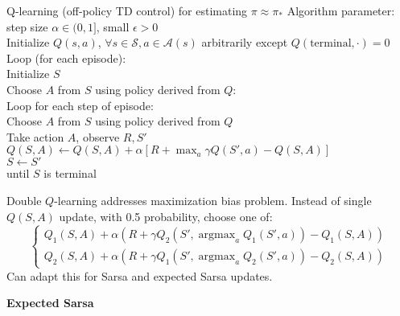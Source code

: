 \documentclass[twocolumn]{article}
\DeclareMathOperator*{\argmax}{argmax}
\begin{document}
\begin{mydef}{Q-learning (off-policy TD control) for estimating $\pi \approx \pi_*$}{}
    Algorithm parameter: step size $\alpha \in (0, 1]$, small $\epsilon > 0$ \\
    Initialize $Q(s,a)$, $\forall s \in \mathcal S, a \in \mathcal A(s)$ arbitrarily except $Q(\text{terminal}, \cdot) = 0$ \\
    
        Loop (for each episode): \\
            \hspace*{2em}Initialize $S$ \\
            \hspace*{2em}Choose $A$ from $S$ using policy derived from $Q$: \\
            \hspace*{2em}Loop for each step of episode: \\
                \hspace*{4em}Choose $A$ from $S$ using policy derived from $Q$ \\
                \hspace*{4em}Take action $A$, observe $R, S'$ \\
                \hspace*{4em}$Q(S,A) \leftarrow Q(S,A) + \alpha[R + \max_a \gamma Q(S', a) - Q(S, A)]$ \\
                \hspace*{4em}$S \leftarrow S'$ \\
            \hspace*{2em}until $S$ is terminal
\end{mydef}

Double $Q$-learning addresses maximization bias problem. Instead of single $Q(S,A)$ update, with 0.5 probability, choose one of:
\begin{equation*}
    \begin{cases}
        Q_1(S,A) + \alpha \left( R + \gamma Q_2(S', \argmax_a Q_1(S', a)) - Q_1(S, A) \right) \\
        Q_2(S,A) + \alpha \left( R + \gamma Q_1(S', \argmax_a Q_2(S', a)) - Q_2(S, A) \right)
    \end{cases}
\end{equation*}
Can adapt this for Sarsa and expected Sarsa updates.

\vspace{-.5em}
\dotfill


\textbf{Expected Sarsa}
\end{document}
